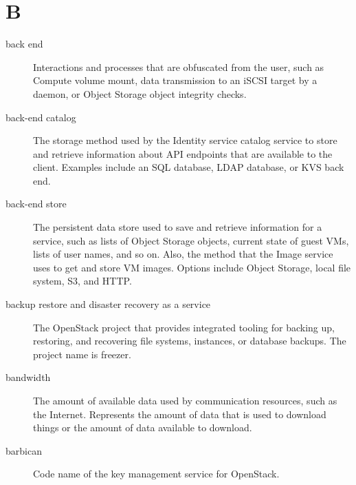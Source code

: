 \documentclass[letterpaper,10pt,english]{sphinxmanual}
\begin{document}
\section{B}
\label{_source/glossary:b}\begin{description}
\item[{back end}] \leavevmode{}\label{_source/glossary:term-back-end}
Interactions and processes that are obfuscated from the user,
such as Compute volume mount, data transmission to an iSCSI target by
a daemon, or Object Storage object integrity checks.

\item[{back-end catalog}] \leavevmode{}\label{_source/glossary:term-back-end-catalog}
The storage method used by the Identity service catalog service
to store and retrieve information about API endpoints that are
available to the client. Examples include an SQL database, LDAP
database, or KVS back end.

\item[{back-end store}] \leavevmode{}\label{_source/glossary:term-back-end-store}
The persistent data store used to save and retrieve information
for a service, such as lists of Object Storage objects, current state
of guest VMs, lists of user names, and so on. Also, the method that the
Image service uses to get and store VM images. Options include Object
Storage, local file system, S3, and HTTP.

\item[{backup restore and disaster recovery as a service}] \leavevmode{}\label{_source/glossary:term-backup-restore-and-disaster-recovery-as-a-service}
The OpenStack project that provides integrated tooling for
backing up, restoring, and recovering file systems,
instances, or database backups. The project name is freezer.

\item[{bandwidth}] \leavevmode{}\label{_source/glossary:term-bandwidth}
The amount of available data used by communication resources,
such as the Internet. Represents the amount of data that is used to
download things or the amount of data available to download.

\item[{barbican}] \leavevmode{}\label{_source/glossary:term-barbican}
Code name of the key management service for OpenStack.


\end{description}
\end{document}
